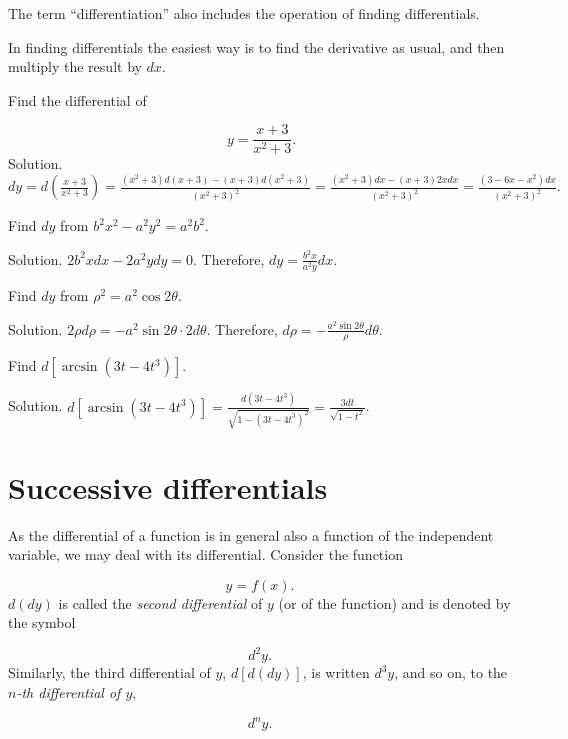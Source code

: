 The term ``differentiation'' also includes the operation of finding differentials.

In finding differentials the easiest way is to find the derivative 
as usual, and then multiply the result by $dx$.


\begin{example}
{\rm
Find the differential of

\[
 	\ y 	= \frac{x + 3}{x^2 + 3}.
\]
Solution. 
$dy = d \left( \frac{x + 3}{x^2 + 3} \right) 	
= \frac{(x^2 + 3)d(x + 3) - (x + 3)d(x^2 + 3)}{(x^2 + 3)^2}
= \frac{(x^2 + 3)dx - (x + 3) 2x dx}{(x^2 + 3)^2} 	
= \frac{(3 - 6x - x^2)dx}{(x^2 + 3)^2}.
$
}
\end{example}

\begin{example}
{\rm
Find $dy$ from $b^2x^2 - a^2y^2=a^2b^2$.

Solution. $2b^2xdx - 2a^2ydy =	0$. Therefore, $dy= \frac{b^2 x}{a^2 y} dx$. 
}
\end{example}

\begin{example}
{\rm
Find $dy$ from $\rho^2 	= a^2\cos2\theta$.

Solution. $2\rho d\rho
= -a^2 \sin 2\theta \cdot 2d\theta$.
Therefore, $d\rho= -\frac{a^2 \sin 2\theta}{\rho} d\theta$.
}
\end{example}

\begin{example}
{\rm
Find $d[\arcsin(3t - 4t^3)]$.

Solution. $d[ \arcsin (3t - 4t^3) ] 
= \frac{d(3t - 4t^3)}{\sqrt{1 - (3t - 4t^3)^2}} 
= \frac{3 dt}{\sqrt{1 - t^2}}$.
}
\end{example}


\section{Successive differentials}

As the differential of a function is in general also a function of the 
independent variable, we may deal with its differential.
Consider the function

\[
    y = f(x).
\]
$d(dy)$ is called the {\it second differential} of $y$ 
(or of the function) and is denoted by the symbol

\[
   d^2y.
\]
Similarly, the third differential of $y$, $d[d(dy)]$, is written
$d^3y$, and so on, to the {\it $n$-th differential of $y$},

\[
   d^ny. 
\]

